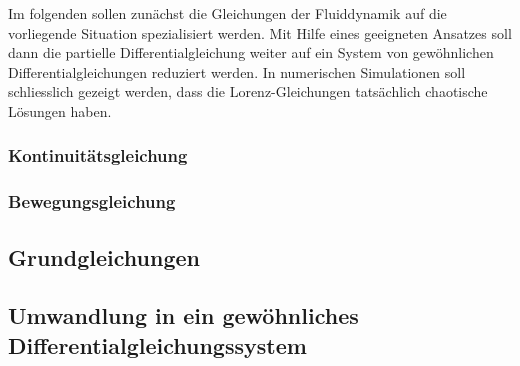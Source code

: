 Im folgenden sollen zunächst die Gleichungen der Fluiddynamik auf die
vorliegende Situation spezialisiert werden.
Mit Hilfe eines geeigneten Ansatzes soll dann die partielle
Differentialgleichung weiter auf ein System von gewöhnlichen 
Differentialgleichungen reduziert werden.
In numerischen Simulationen soll schliesslich gezeigt werden, dass die 
Lorenz-Gleichungen tatsächlich chaotische Lösungen haben.

\subsubsection{Kontinuitätsgleichung}
\subsubsection{Bewegungsgleichung}

\subsection{Grundgleichungen}

\subsection{Umwandlung in ein gewöhnliches Differentialgleichungssystem}

